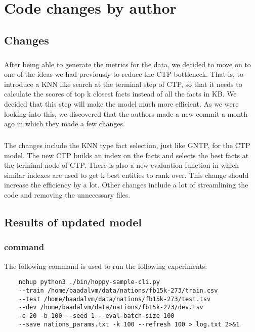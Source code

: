 \documentclass[Other]{iitddiss}
\begin{document}
\chapter{Code changes by author}
\section{Changes}
\paragraph{}
After being able to generate the metrics for the data, we decided to move on to one of the ideas we had previously to reduce the CTP bottleneck. That is, to introduce a KNN like search at the terminal step of CTP, so that it needs to calculate the scores of top k closest facts instead of all the facts in KB. We decided that this step will make the model much more efficient. As we were looking into this, we discovered that the authors made a new commit a month ago in which they made a few changes. 

\paragraph{}
The changes include the KNN type fact selection, just like GNTP, for the CTP model. The new CTP builds an index on the facts and selects the best facts at the terminal node of CTP. There is also a new evaluation function in which similar indexes are used to get k best entities to rank over.
 This change should increase the efficiency by a lot. Other changes include a lot of streamlining the code and removing the unnecessary files.

\section{Results of updated model}
\subsection{command}
The following command is used to run the following experiments:
\begin{verbatim}
	nohup python3 ./bin/hoppy-sample-cli.py 
	--train /home/baadalvm/data/nations/fb15k-273/train.csv
 	--test /home/baadalvm/data/nations/fb15k-273/test.tsv 
	--dev /home/baadalvm/data/nations/fb15k-273/dev.tsv
	-e 20 -b 100 --seed 1 --eval-batch-size 100 
	--save nations_params.txt -k 100 --refresh 100 > log.txt 2>&1	
\end{verbatim}
\end{document}

